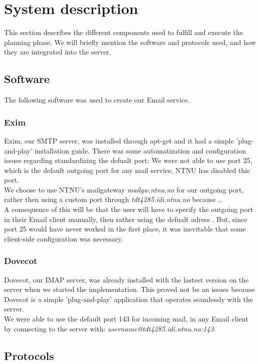 \section{System description}
This section describes the different components used to fulfill and execute the planning phase. We will briefly mention the software and protocols used, and how they are integrated into the server.

\subsection{Software}
The following software was used to create our Email service.
\subsubsection{Exim}
Exim, our SMTP server, was installed through apt-get and it had a simple 'plug-and-play' installation guide. There was some automatization and configuration issues regarding standardizing the defualt port: We were not able to use port 25, which is the default outgoing port for any mail service, NTNU has disabled this port. \\
We choose to use NTNU's mailgateway \emph{mailgw.ntnu.no} for our outgoing port, rather then using a custom port through \emph{tdt4285.idi.ntnu.no} because .. \\
A consequence of this will be that the user will have to specify the outgoing port in their Email client manually, then rather using the defualt adress . But, since port 25 would have never worked in the first place, it was inevitable that some client-side configuration was necessary.

\subsubsection{Dovecot}
Dovecot, our IMAP server, was already installed with the lastest version on the server when we started the implementation. This proved not be an issues because Dovecot is a simple 'plug-and-play' application that operates seamlessly with the server. \\
We were able to use the default port 143 for incoming mail, in any Email client by connecting to the server with: \emph{username@tdt4285.idi.ntnu.no:143}.


\subsection{Protocols}
